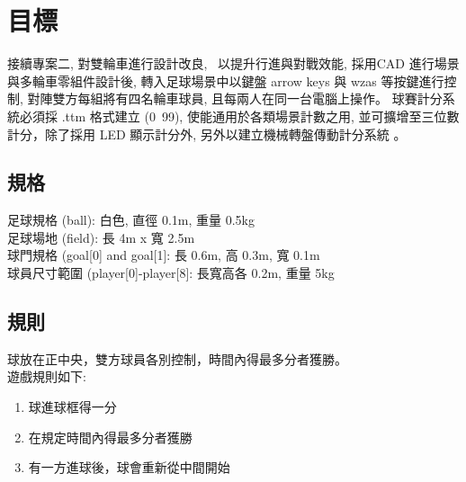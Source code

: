 \chapter{目標}
接續專案二, 對雙輪車進行設計改良,  以提升行進與對戰效能, 採用CAD 進行場景與多輪車零組件設計後, 轉入足球場景中以鍵盤 arrow keys 與 wzas 等按鍵進行控制, 對陣雙方每組將有四名輪車球員, 且每兩人在同一台電腦上操作。
球賽計分系統必須採 .ttm 格式建立 (0~99), 使能通用於各類場景計數之用, 並可擴增至三位數計分，除了採用 LED 顯示計分外, 另外以建立機械轉盤傳動計分系統 。

\section{規格}
足球規格 (ball): 白色, 直徑 0.1m, 重量 0.5kg \\
足球場地 (field): 長 4m x 寬 2.5m \\
球門規格 (goal[0] and goal[1]: 長 0.6m, 高 0.3m, 寬 0.1m \\
球員尺寸範圍 (player[0]-player[8]: 長寬高各 0.2m, 重量 5kg \\

\section{規則}
球放在正中央，雙方球員各別控制，時間內得最多分者獲勝。 \\
遊戲規則如下: \\
\begin{enumerate}
\item 球進球框得一分 \\
\item 在規定時間內得最多分者獲勝 \\
\item 有一方進球後，球會重新從中間開始 \\
\end{enumerate}
